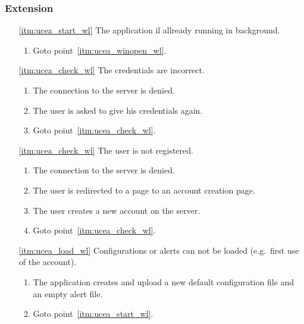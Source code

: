 \subsubsection{Extension}
\begin{enumerate}
	\item[\ref{itm:ucea_start_wl}] The application il allready running in background.
	\begin{enumerate}[i]
		\item Goto point~\ref{itm:ucea_winopen_wl}.
	\end{enumerate}
	
	\item[\ref{itm:ucea_check_wl}] The credentials are incorrect.
	\begin{enumerate}[i]
		\item The connection to the server is denied.
		\item The user is asked to give his credentials again.
		\item Goto point~\ref{itm:ucea_check_wl}.
	\end{enumerate}
	
		\item[\ref{itm:ucea_check_wl}] The user is not registered.
	\begin{enumerate}[i]
		\item The connection to the server is denied.
		\item The user is redirected to a page to an account creation page.
		\item The user creates a new account on the server.
		\item Goto point~\ref{itm:ucea_check_wl}.
	\end{enumerate}
	
	\item[\ref{itm:ucea_load_wl}] Configurations or alerts can not be loaded (e.g.\ first use of the account).
	\begin{enumerate}[i]
		\item The application creates and upload a new default configuration file and an empty alert file.
		\item Goto point~\ref{itm:ucea_start_wl}.
	\end{enumerate}
\end{enumerate}
